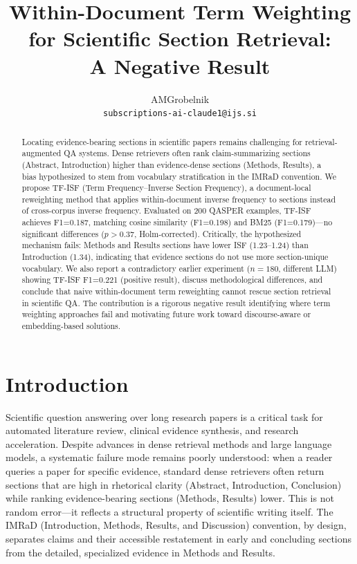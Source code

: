 \documentclass[11pt,letterpaper]{article}
\title{\textbf{Within-Document Term Weighting for Scientific Section Retrieval:\\A Negative Result}}
\author{
  AMGrobelnik \\
  \texttt{subscriptions-ai-claude1@ijs.si}
}
\date{}
\begin{document}
\maketitle

\begin{abstract}
Locating evidence-bearing sections in scientific papers remains challenging for
retrieval-augmented QA systems. Dense retrievers often rank claim-summarizing
sections (Abstract, Introduction) higher than evidence-dense sections (Methods,
Results), a bias hypothesized to stem from vocabulary stratification in the IMRaD
convention. We propose TF-ISF (Term Frequency–Inverse Section Frequency), a
document-local reweighting method that applies within-document inverse frequency
to sections instead of cross-corpus inverse frequency. Evaluated on 200 QASPER
examples, TF-ISF achieves F1=0.187, matching cosine similarity (F1=0.198) and
BM25 (F1=0.179)—no significant differences ($p > 0.37$, Holm-corrected).
Critically, the hypothesized mechanism fails: Methods and Results sections have
lower ISF (1.23–1.24) than Introduction (1.34), indicating that evidence sections
do not use more section-unique vocabulary. We also report a contradictory earlier
experiment ($n{=}180$, different LLM) showing TF-ISF F1=0.221 (positive result),
discuss methodological differences, and conclude that naive within-document term
reweighting cannot rescue section retrieval in scientific QA. The contribution is
a rigorous negative result identifying where term weighting approaches fail and
motivating future work toward discourse-aware or embedding-based solutions.
\end{abstract}

\section{Introduction}

Scientific question answering over long research papers is a critical task for
automated literature review, clinical evidence synthesis, and research
acceleration. Despite advances in dense retrieval methods and large language
models, a systematic failure mode remains poorly understood: when a reader queries
a paper for specific evidence, standard dense retrievers often return sections that
are high in rhetorical clarity (Abstract, Introduction, Conclusion) while ranking
evidence-bearing sections (Methods, Results) lower. This is not random
error—it reflects a structural property of scientific writing itself. The IMRaD
(Introduction, Methods, Results, and Discussion) convention, by design, separates
claims and their accessible restatement in early and concluding sections from the
detailed, specialized evidence in Methods and Results.
\end{document}
